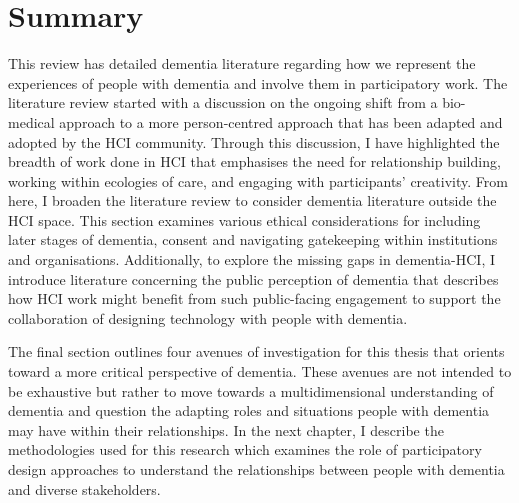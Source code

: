 \section{Summary}
\label{BL:summary}
This review has detailed dementia literature regarding how we represent the experiences of people with dementia and involve them in participatory work. The literature review started with a discussion on the ongoing shift from a bio-medical approach to a more person-centred approach that has been adapted and adopted by the HCI community. Through this discussion, I have highlighted the breadth of work done in HCI that emphasises the need for relationship building, working within ecologies of care, and engaging with participants' creativity. From here, I broaden the literature review to consider dementia literature outside the HCI space. This section examines various ethical considerations for including later stages of dementia, consent and navigating gatekeeping within institutions and organisations. Additionally, to explore the missing gaps in dementia-HCI, I introduce literature concerning the public perception of dementia that describes how HCI work might benefit from such public-facing engagement to support the collaboration of designing technology with people with dementia.

The final section outlines four avenues of investigation for this thesis that orients toward a more critical perspective of dementia. These avenues are not intended to be exhaustive but rather to move towards a multidimensional understanding of dementia and question the adapting roles and situations people with dementia may have within their relationships. In the next chapter, I describe the methodologies used for this research which examines the role of participatory design approaches to understand the relationships between people with dementia and diverse stakeholders.
